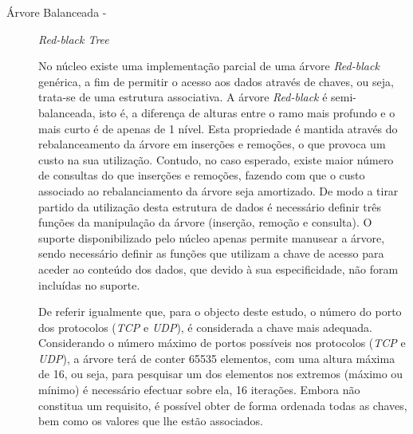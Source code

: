 \begin{description}

\item[Árvore Balanceada - ] \textit{Red-black Tree} 

No núcleo existe uma implementação parcial de uma árvore \textit{Red-black} genérica, a fim de permitir o acesso aos dados através de chaves, ou seja, trata-se de uma estrutura associativa.
A árvore \textit{Red-black} é semi-balanceada, isto é, a diferença de alturas entre o ramo mais profundo e o mais curto é de apenas de 1 nível.
Esta propriedade é mantida através do rebalanceamento da árvore em inserções e remoções, o que provoca um custo na sua utilização.
Contudo, no caso esperado, existe maior número de consultas do que inserções e remoções, fazendo com que o custo associado ao rebalanciamento da árvore seja amortizado.
De modo a tirar partido da utilização desta estrutura de dados é necessário definir três funções da manipulação da árvore (inserção, remoção e consulta).
O suporte disponibilizado pelo núcleo apenas permite manusear a árvore, sendo necessário definir as funções que utilizam a chave de acesso para aceder ao conteúdo dos dados, que devido à sua especificidade, não foram incluídas no suporte.

De referir igualmente que, para o objecto deste estudo, o número do porto dos protocolos (\textit{TCP} e \textit{UDP}), é considerada a chave mais adequada.
Considerando o número máximo de portos possíveis nos protocolos (\textit{TCP} e \textit{UDP}), a árvore terá de conter 65535 elementos, com uma altura máxima de 16, ou seja, para pesquisar um dos elementos nos extremos (máximo ou mínimo) é necessário efectuar sobre ela, 16 iterações.
Embora não constitua um requisito, é possível obter de forma ordenada todas as chaves, bem como os valores que lhe estão associados.






\end{description}

